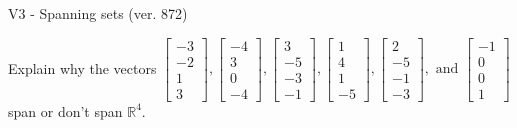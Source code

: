 \begin{exercise}
  \begin{exerciseTitle}V3 - Spanning sets (ver. 872)\end{exerciseTitle}
  \begin{exerciseStatement}
    Explain why the vectors \(\left[\begin{array}{r}
-3 \\
-2 \\
1 \\
3
\end{array}\right] , \left[\begin{array}{r}
-4 \\
3 \\
0 \\
-4
\end{array}\right] , \left[\begin{array}{r}
3 \\
-5 \\
-3 \\
-1
\end{array}\right] , \left[\begin{array}{r}
1 \\
4 \\
1 \\
-5
\end{array}\right] , \left[\begin{array}{r}
2 \\
-5 \\
-1 \\
-3
\end{array}\right] , \text{ and } \left[\begin{array}{r}
-1 \\
0 \\
0 \\
1
\end{array}\right]\) span or don't span \(\mathbb{R}^4\). 
	



\end{exerciseStatement}
\end{exercise}
